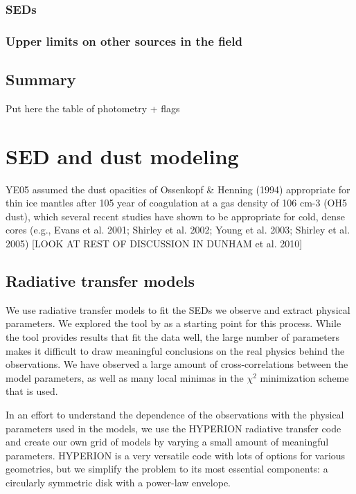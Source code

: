 \subsubsection{SEDs}

\subsubsection{Upper limits on other sources in the field}


\subsection{Summary}

Put here the table of photometry + flags



\section{SED and dust modeling}

YE05 assumed the dust opacities of Ossenkopf \& Henning
(1994) appropriate for thin ice mantles after 105 year of coagulation at a gas density of 106 cm-3 (OH5 dust), which several recent studies have shown to be appropriate for cold, dense cores (e.g., Evans et al. 2001; Shirley et al. 2002; Young et al. 2003; Shirley et al. 2005) [LOOK AT REST OF DISCUSSION IN DUNHAM et al. 2010]

\subsection{Radiative transfer models}

We use radiative transfer models to fit the SEDs we observe and extract physical parameters. We explored the tool by \cite{Robitaille:2006cb} as a starting point for this process. While the tool provides results that fit the data well, the large number of parameters makes it difficult to draw meaningful conclusions on the real physics behind the observations. We have observed a large amount of cross-correlations between the model parameters, as well as many local minimas in the $\chi^2$ minimization scheme that is used.

In an effort to understand the dependence of the observations with the physical parameters used in the models, we use the HYPERION radiative transfer code \citep{Robitaille:2011fc} and create our own grid of models by varying a small amount of meaningful parameters. HYPERION is a very versatile code with lots of options for various geometries, but we simplify the problem to its most essential components: a circularly symmetric disk with a power-law envelope.

